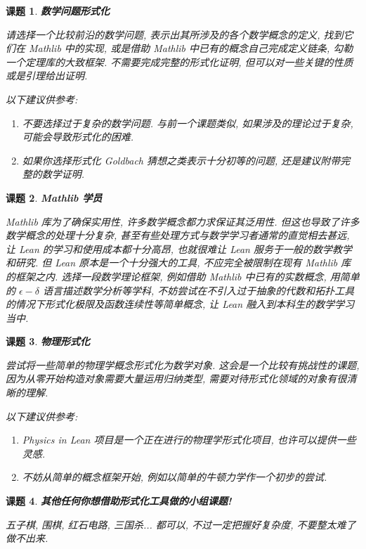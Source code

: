 \documentclass[UTF8]{ctexart}
\DeclareMathOperator{\0}{\mathbf{0}}                    %
\newcommand{\<}{\langle}
\renewcommand{\>}{\rangle}                              %
\newenvironment{xmp_box}{
    \begin{tcolorbox}[enhanced, colback=xmp_purple2, boxrule=0pt, frame hidden,
        borderline west={0.7mm}{0.1mm}{xmp_purple1},breakable]
    }
    {\end{tcolorbox}}
\theoremstyle{MyStyle} %
\newtheorem{project}{课题}
\newenvironment{prj}[1]
{
    \begin{xmp_box}
        \begin{project}
            \textbf{#1}
            \newline
}
{
        \end{project}
    \end{xmp_box}
}
\begin{document}
            \begin{prj}
                {数学问题形式化}
                请选择一个比较前沿的数学问题, 表示出其所涉及的各个数学概念的定义, 找到它们在 Mathlib 中的实现, 或是借助 Mathlib 中已有的概念自己完成定义链条, 勾勒一个定理库的大致框架. 不需要完成完整的形式化证明, 但可以对一些关键的性质或是引理给出证明. 

                以下建议供参考: 
                \begin{enumerate}
                    \item 不要选择过于复杂的数学问题. 与前一个课题类似, 如果涉及的理论过于复杂, 可能会导致形式化的困难. 
                    \item 如果你选择形式化 Goldbach 猜想之类表示十分初等的问题, 还是建议附带完整的数学证明. 
                \end{enumerate}
            \end{prj}

            \begin{prj}
                {Mathlib 学员}
                Mathlib 库为了确保实用性, 许多数学概念都力求保证其泛用性. 但这也导致了许多数学概念的处理十分复杂, 甚至有些处理方式与数学学习者通常的直觉相去甚远, 让 Lean 的学习和使用成本都十分高昂, 也就很难让 Lean 服务于一般的数学教学和研究. 但 Lean 原本是一个十分强大的工具, 不应完全被限制在现有 Mathlib 库的框架之内. 选择一段数学理论框架, 例如借助 Mathlib 中已有的实数概念, 用简单的 $\epsilon-\delta$ 语言描述数学分析等学科, 不妨尝试在不引入过于抽象的代数和拓扑工具的情况下形式化极限及函数连续性等简单概念, 让 Lean 融入到本科生的数学学习当中. 
            \end{prj}

            \begin{prj}
                {物理形式化}
                尝试将一些简单的物理学概念形式化为数学对象. 这会是一个比较有挑战性的课题, 因为从零开始构造对象需要大量运用归纳类型, 需要对待形式化领域的对象有很清晰的理解. 

                以下建议供参考: 
                \begin{enumerate}
                    \item Physics in Lean 项目是一个正在进行的物理学形式化项目, 也许可以提供一些灵感. 
                    \item 不妨从简单的概念框架开始, 例如以简单的牛顿力学作一个初步的尝试. 
                \end{enumerate}
            \end{prj}

            \begin{prj}
                {其他任何你想借助形式化工具做的小组课题! }
                五子棋, 围棋, 红石电路, 三国杀... 都可以, 不过一定把握好复杂度, 不要整太难了做不出来. 
            \end{prj}
\end{document}
